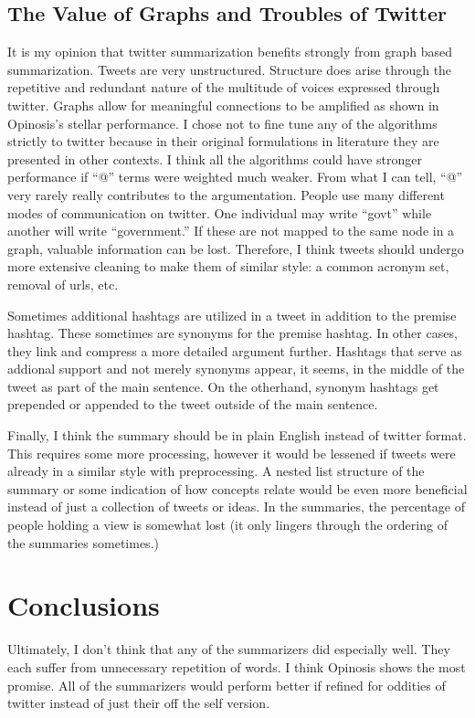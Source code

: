 \documentclass[paper=letter, fontsize=12pt]{article}
\begin{document}
\subsection{The Value of Graphs and Troubles of Twitter}
It is my opinion that twitter summarization benefits strongly from graph based summarization. Tweets are very unstructured. Structure does arise through the repetitive and redundant nature of the multitude of voices expressed through twitter. Graphs allow for meaningful connections to be amplified as shown in Opinosis's stellar performance. I chose not to fine tune any of the algorithms strictly to twitter because in their original formulations in literature they are presented in other contexts. I think all the algorithms could have stronger performance if ``@'' terms were weighted much weaker. From what I can tell, ``@'' very rarely really contributes to the argumentation. People use many different modes of communication on twitter. One individual may write ``govt'' while another will write ``government.'' If these are not mapped to the same node in a graph, valuable information can be lost. Therefore, I think tweets should undergo more extensive cleaning to make them of similar style: a common acronym set, removal of urls, etc.

Sometimes additional hashtags are utilized in a tweet in addition to the premise hashtag. These sometimes are synonyms for the premise hashtag. In other cases, they link and compress a more detailed argument further. Hashtags that serve as addional support and not merely synonyms appear, it seems, in the middle of the tweet as part of the main sentence. On the otherhand, synonym hashtags get prepended or appended to the tweet outside of the main sentence. 

Finally, I think the summary should be in plain English instead of twitter format. This requires some more processing, however it would be lessened if tweets were already in a similar style with preprocessing. A nested list structure of the summary or some indication of how concepts relate would be even more beneficial instead of just a collection of tweets or ideas. In the summaries, the percentage of people holding a view is somewhat lost (it only lingers through the ordering of the summaries sometimes.)

\section{Conclusions}
Ultimately, I don't think that any of the summarizers did especially well. They each suffer from unnecessary repetition of words. I think Opinosis shows the most promise. All of the summarizers would perform better if refined for oddities of twitter instead of just their off the self version. 



\end{document}
